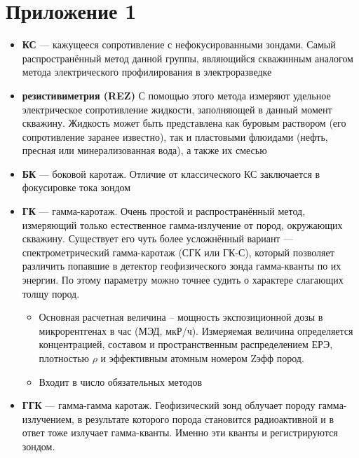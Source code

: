 \documentclass[aps,%
12pt,%
final,%
oneside,
onecolumn,%
musixtex, %
superscriptaddress,%
centertags]{article} %
\begin{document}
\section{Приложение 1}
\begin{itemize}
  \item \textbf{КС} — кажущееся сопротивление с нефокусированными зондами. Самый распространённый метод данной группы, являющийся скважинным аналогом метода электрического профилирования в электроразведке
  \item \textbf{резистивиметрия (REZ)} С помощью этого метода измеряют удельное электрическое сопротивление жидкости, заполняющей в данный момент скважину. Жидкость может быть представлена как буровым раствором (его сопротивление заранее известно), так и пластовыми флюидами (нефть, пресная или минерализованная вода), а также их смесью
  \item \textbf{БК} — боковой каротаж. Отличие от классического КС заключается в фокусировке тока зондом
  \item \textbf{ГК} — гамма-каротаж. Очень простой и распространённый метод, измеряющий только естественное гамма-излучение от пород, окружающих скважину. Существует его чуть более усложнённый вариант — спектрометрический гамма-каротаж (СГК или ГК-С), который позволяет различить попавшие в детектор геофизического зонда гамма-кванты по их энергии. По этому параметру можно точнее судить о характере слагающих толщу пород.
  \begin{itemize}
    \item Основная расчетная величина – мощность экспозиционной дозы в микрорентгенах в час (МЭД, мкР/ч). Измеряемая величина определяется концентрацией, составом и пространственным распределением ЕРЭ, плотностью $\rho$ и эффективным атомным номером Zэфф пород.
    \item Входит в число обязательных методов
  \end{itemize}
  \item \textbf{ГГК} — гамма-гамма каротаж. Геофизический зонд облучает породу гамма-излучением, в результате которого порода становится радиоактивной и в ответ тоже излучает гамма-кванты. Именно эти кванты и регистрируются зондом.
\end{itemize}
\end{document}
